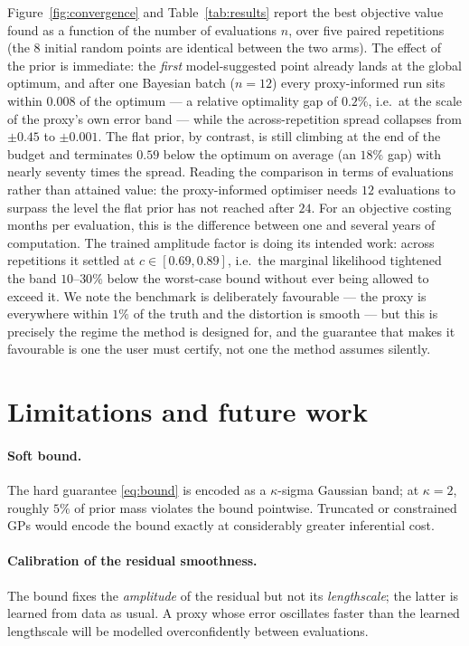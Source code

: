 \documentclass[11pt,a4paper]{article}
\begin{document}
Figure~\ref{fig:convergence} and Table~\ref{tab:results} report the best
objective value found as a function of the number of evaluations $n$, over
five paired repetitions (the $8$ initial random points are identical between
the two arms). The effect of the prior is immediate: the \emph{first}
model-suggested point already lands at the global optimum, and after one
Bayesian batch ($n = 12$) every proxy-informed run sits within $0.008$ of the
optimum --- a relative optimality gap of $0.2\%$, i.e.\ at the scale of the
proxy's own error band --- while the across-repetition spread collapses from
$\pm 0.45$ to $\pm 0.001$. The flat prior, by contrast, is still climbing at
the end of the budget and terminates $0.59$ below the optimum on average (an
$18\%$ gap) with nearly seventy times the spread. Reading the comparison in
terms of evaluations rather than attained value: the proxy-informed optimiser
needs $12$ evaluations to surpass the level the flat prior has not reached
after $24$. For an objective costing months per evaluation, this is the
difference between one and several years of computation. The trained
amplitude factor is doing its intended work: across repetitions it settled at
$c \in [0.69, 0.89]$, i.e.\ the marginal likelihood tightened the band
$10$--$30\%$ below the worst-case bound without ever being allowed to exceed
it. We note the benchmark is deliberately favourable --- the proxy is
everywhere within $1\%$ of the truth and the distortion is smooth --- but
this is precisely the regime the method is designed for, and the guarantee
that makes it favourable is one the user must certify, not one the method
assumes silently.

\section{Limitations and future work}

\paragraph{Soft bound.} The hard guarantee \eqref{eq:bound} is encoded as a
$\kappa$-sigma Gaussian band; at $\kappa = 2$, roughly $5\%$ of prior mass
violates the bound pointwise. Truncated or constrained GPs would encode the
bound exactly at considerably greater inferential cost.

\paragraph{Calibration of the residual smoothness.} The bound fixes the
\emph{amplitude} of the residual but not its \emph{lengthscale}; the latter is
learned from data as usual. A proxy whose error oscillates faster than the
learned lengthscale will be modelled overconfidently between evaluations.
\end{document}
